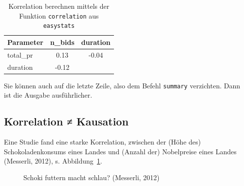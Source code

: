 \documentclass[
  letterpaper,
  oneside,
  open=any]{scrbook}
\theoremstyle{definition}
\theoremstyle{definition}
\theoremstyle{definition}
\theoremstyle{remark}
\begin{document}
\begin{longtable}[]{@{}lcc@{}}

\caption{\label{tbl-mario-corr1}Korrelation berechnen mittels der
Funktion \texttt{correlation} aus \texttt{easystats}}

\tabularnewline

\toprule\noalign{}
Parameter & n\_bids & duration \\
\midrule\noalign{}
\endhead
\bottomrule\noalign{}
\endlastfoot
total\_pr & 0.13 & -0.04 \\
duration & -0.12 & \\

\end{longtable}

Sie können auch auf die letzte Zeile, also dem Befehl \texttt{summary}
verzichten. Dann ist die Ausgabe ausführlicher.

\subsection{Korrelation ≠ Kausation}\label{korrelation-kausation}

Eine Studie fand eine starke Korrelation, zwischen der (Höhe des)
Schokoladenkonsums eines Landes und (Anzahl der) Nobelpreise eines
Landes (Messerli, 2012), s. Abbildung~\ref{fig-schoki}.

\begin{figure}


\caption{\label{fig-schoki}Schoki futtern macht schlau? (Messerli,
2012)}

\end{figure}%
\end{document}

